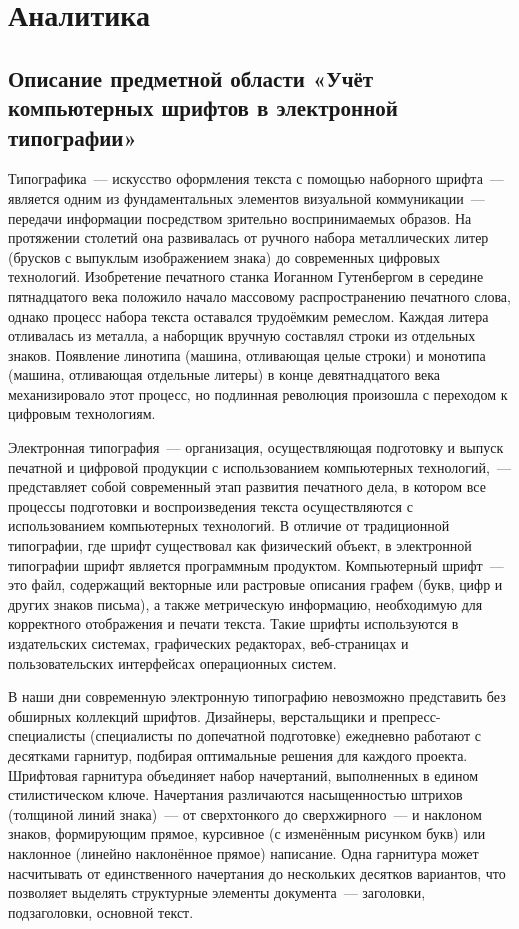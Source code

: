 \section{Аналитика}

\subsection{Описание предметной области «Учёт компьютерных шрифтов в электронной типографии»}

Типографика~--- искусство оформления текста с помощью наборного шрифта~--- является одним из фундаментальных элементов визуальной коммуникации~--- передачи информации посредством зрительно воспринимаемых образов. На протяжении столетий она развивалась от ручного набора металлических литер (брусков с выпуклым изображением знака) до современных цифровых технологий. Изобретение печатного станка Иоганном Гутенбергом в середине пятнадцатого века положило начало массовому распространению печатного слова, однако процесс набора текста оставался трудоёмким ремеслом. Каждая литера отливалась из металла, а наборщик вручную составлял строки из отдельных знаков. Появление линотипа (машина, отливающая целые строки) и монотипа (машина, отливающая отдельные литеры) в конце девятнадцатого века механизировало этот процесс, но подлинная революция произошла с переходом к цифровым технологиям.

Электронная типография~--- организация, осуществляющая подготовку и выпуск печатной и цифровой продукции с использованием компьютерных технологий,~--- представляет собой современный этап развития печатного дела, в котором все процессы подготовки и воспроизведения текста осуществляются с использованием компьютерных технологий. В отличие от традиционной типографии, где шрифт существовал как физический объект, в электронной типографии шрифт является программным продуктом. Компьютерный шрифт~--- это файл, содержащий векторные или растровые описания графем (букв, цифр и других знаков письма), а также метрическую информацию, необходимую для корректного отображения и печати текста. Такие шрифты используются в издательских системах, графических редакторах, веб-страницах и пользовательских интерфейсах операционных систем.

В наши дни современную электронную типографию невозможно представить без обширных коллекций шрифтов. Дизайнеры, верстальщики и препресс-специалисты (специалисты по допечатной подготовке) ежедневно работают с десятками гарнитур, подбирая оптимальные решения для каждого проекта. Шрифтовая гарнитура объединяет набор начертаний, выполненных в едином стилистическом ключе. Начертания различаются насыщенностью штрихов (толщиной линий знака)~--- от сверхтонкого до сверхжирного~--- и наклоном знаков, формирующим прямое, курсивное (с изменённым рисунком букв) или наклонное (линейно наклонённое прямое) написание. Одна гарнитура может насчитывать от единственного начертания до нескольких десятков вариантов, что позволяет выделять структурные элементы документа~--- заголовки, подзаголовки, основной текст.

